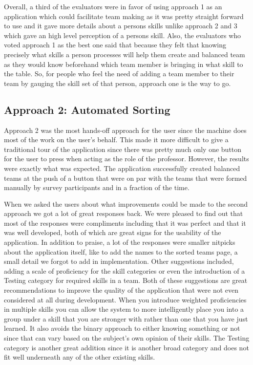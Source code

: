 \documentclass[conference]{IEEEtran}
\begin{document}
Overall, a third of the evaluators were in favor of using approach 1 as an application which could facilitate team making as it was pretty straight forward to use and it gave more details about a persons skills unlike approach 2 and 3 which gave an high level perception of a persons skill. Also, the evaluators who voted approach 1 as the best one said that because they felt that knowing precisely what skills a person processes will help them create and balanced team as they would know beforehand which team member is bringing in what skill to the table. So, for people who feel the need of adding a team member to their team by gauging the skill set of that person, approach one is the way to go. 

\subsection{Approach 2: Automated Sorting}
Approach 2 was the most hands-off approach for the user since the machine does most of the work on the user's behalf. This made it more difficult to give a traditional tour of the application since there was pretty much only one button for the user to press when acting as the role of the professor. However, the results were exactly what was expected. The application successfully created balanced teams at the push of a button that were on par with the teams that were formed manually by survey participants and in a fraction of the time. 

When we asked the users about what improvements could be made to the second approach we got a lot of great responses back. We were pleased to find out that most of the responses were compliments including that it was perfect and that it was well developed, both of which are great signs for the usability of the application. In addition to praise, a lot of the responses were smaller nitpicks about the application itself, like to add the names to the sorted teams page, a small detail we forgot to add in implementation. Other suggestions included, adding a scale of proficiency for the skill categories or even the introduction of a Testing category for required skills in a team. Both of these suggestions are great recommendations to improve the quality of the application that were not even considered at all during development. When you introduce weighted proficiencies in multiple skills you can allow the system to more intelligently place you into a group under a skill that you are stronger with rather than one that you have just learned. It also avoids the binary approach to either knowing something or not since that can vary based on the subject's own opinion of their skills. The Testing category is another great addition since it is another broad category and does not fit well underneath any of the other existing skills. 
\end{document}
